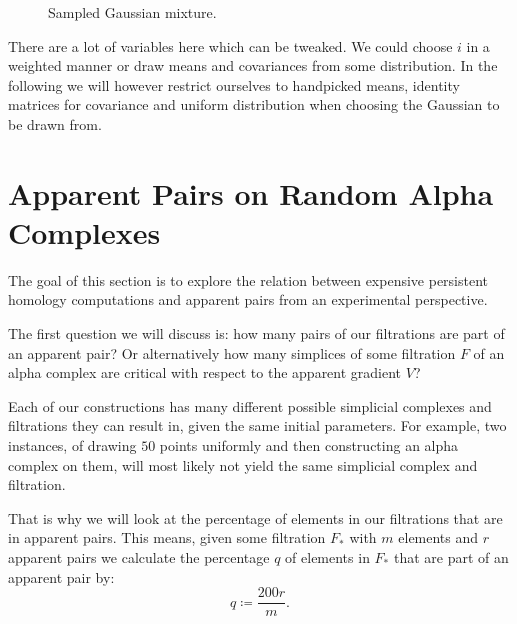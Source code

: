\begin{figure}[H]
\begin{subfigure}[t]{0.49\textwidth}
\begin{center}


\end{center}
\end{subfigure}
\begin{subfigure}[t]{0.49\textwidth}
\begin{center}

\end{center}
\end{subfigure}
\caption{Sampled Gaussian mixture.}
\label{fig:mixture}
\end{figure}

There are a lot of variables here which can be tweaked. We could choose $i$ in a weighted manner or draw means and covariances from some distribution. In the following we will however restrict ourselves to handpicked means, identity matrices for covariance and uniform distribution when choosing the Gaussian to be drawn from.  

\section{Apparent Pairs on Random Alpha Complexes}
The goal of this section is to explore the relation between expensive persistent homology computations and apparent pairs from an experimental perspective.

The first question we will discuss is: how many pairs of our filtrations are part of an apparent pair? Or alternatively how many simplices of some filtration $F$ of an alpha complex are critical with respect to the apparent gradient $V$?

Each of our constructions has many different possible simplicial complexes and filtrations they can result in, given the same initial parameters. For example, two instances, of drawing $50$ points uniformly and then constructing an alpha complex on them, will most likely not yield the same simplicial complex and filtration. 

That is why we will look at the percentage of elements in our filtrations that are in apparent pairs. This means, given some filtration $F_*$ with $m$ elements and $r$ apparent pairs we calculate the percentage $q$ of elements in $F_*$ that are part of an apparent pair by: \[
    q \coloneqq \frac{200r}{m}.
\]

